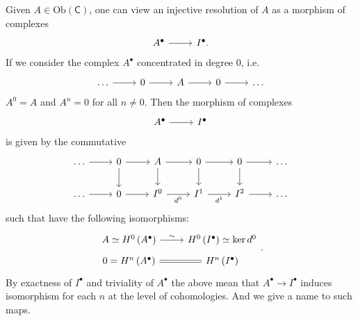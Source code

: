 \documentclass[../Main]{subfiles}
\begin{document}
\begin{rem}
	Given $A \in \mathrm{Ob} \left(\mathsf{C}\right)$, one can view 
	an injective resolution
	of $A$ as a morphism of complexes
	\begin{equation}
	\begin{tikzcd}
		A^\bullet \arrow[r, "", rightarrow] &
		I^\bullet.
	\end{tikzcd}
	\end{equation} 
	If we consider the complex $A^\bullet$ concentrated in degree $0$, i.e.
	\begin{equation}
	\begin{tikzcd}
		\ldots \arrow[r, "", rightarrow] &
		0 \arrow[r, "", rightarrow] &
		A \arrow[r, "", rightarrow] &
		0 \arrow[r, "", rightarrow] &
		\ldots
	\end{tikzcd}
	\end{equation} 
	$A^0 = A$ and $A^n = 0$ for all $n \neq 0$.
	Then the morphism of complexes
	\begin{equation}
	\begin{tikzcd}
		A^\bullet \arrow[r, "", rightarrow] &
		I^\bullet
	\end{tikzcd}
	\end{equation} 
	is given by the commutative
	\begin{equation}
	\begin{tikzcd}
		\ldots \arrow[r, "", rightarrow] &
		0 \arrow[r, "", rightarrow] 
		\arrow[d, "", rightarrow] &
		A \arrow[r, "", rightarrow] 
		\arrow[d, "", rightarrow] &
		0 \arrow[r, "", rightarrow] 
		\arrow[d, "", rightarrow] &
		0 \arrow[r, "", rightarrow]
		\arrow[d, "", rightarrow] &
		\ldots\\
		\ldots \arrow[r, "", rightarrow] &
		0 \arrow[r, "", rightarrow] &
		I^0 \arrow[r, "d^0"', rightarrow] &
		I^1 \arrow[r, "d^1"', rightarrow] &
		I^2 \arrow[r, "", rightarrow] &
		\ldots
	\end{tikzcd}
	\end{equation} 
	such that have the following isomorphisms:
	\begin{equation}
		\begin{tikzcd}[row sep=tiny]
			A \simeq H^{0} \left( A^\bullet \right) \arrow[r, "\sim", rightarrow] &
			H^{0} \left( I^\bullet \right) \simeq 
			\ker d^0\\
			0 = H^{n} \left( A^\bullet \right) 
			\arrow[r, "", equal] &
			H^{n} \left( I^\bullet \right)
		\end{tikzcd}
	.\end{equation} 
	By exactness of $I^\bullet$ and triviality of $A^\bullet$ 
	the above mean that $A^\bullet \to I^\bullet$ induces isomorphism
	for each $n$ at the level of cohomologies.
	And we give a name to such maps.
\end{rem}
				
\end{document}
